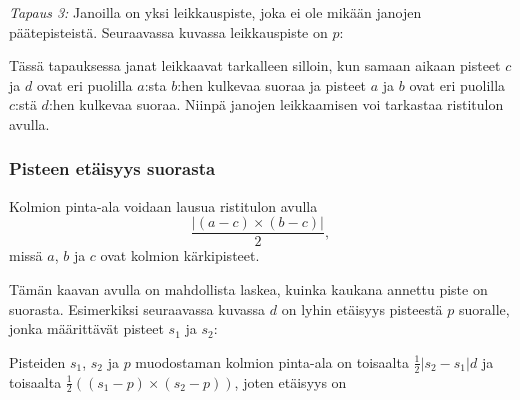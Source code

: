 \textit{Tapaus 3:}
Janoilla on yksi leikkauspiste,
joka ei ole mikään janojen päätepisteistä.
Seuraavassa kuvassa leikkauspiste on $p$:
\begin{center}
\end{center}

Tässä tapauksessa janat leikkaavat
tarkalleen silloin, kun samaan aikaan
pisteet $c$ ja $d$ ovat eri puolilla
$a$:sta $b$:hen kulkevaa suoraa
ja pisteet $a$ ja $b$
ovat eri puolilla 
$c$:stä $d$:hen kulkevaa suoraa.
Niinpä janojen leikkaamisen voi tarkastaa
ristitulon avulla.

% 


\subsubsection{Pisteen etäisyys suorasta}

Kolmion pinta-ala voidaan lausua
ristitulon avulla
\[\frac{| (a-c) \times (b-c) |}{2},\]
missä $a$, $b$ ja $c$ ovat kolmion kärkipisteet.

Tämän kaavan avulla on mahdollista laskea,
kuinka kaukana annettu piste on suorasta.
Esimerkiksi seuraavassa kuvassa $d$
on lyhin etäisyys pisteestä $p$ suoralle,
jonka määrittävät pisteet $s_1$ ja $s_2$:
\begin{center}
\end{center}

Pisteiden $s_1$, $s_2$ ja $p$ muodostaman kolmion
pinta-ala on toisaalta $\frac{1}{2} |s_2-s_1| d$ ja toisaalta
$\frac{1}{2} ((s_1-p) \times (s_2-p))$,
joten etäisyys on


